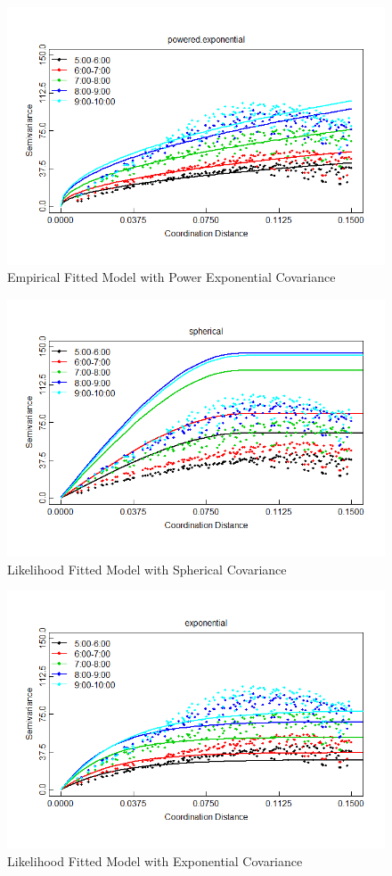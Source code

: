 \documentclass[hidelinks,12pt]{article}
\begin{document}
\FloatBarrier
	\begin{figure}[!ht]
		\includegraphics[width=\textwidth]{semfit_poweredexp.png}
		\caption{Empirical Fitted Model with Power Exponential Covariance \label{fig:sempex}}
	\end{figure}
\FloatBarrier
	\begin{figure}[!ht]
		\includegraphics[width=\textwidth]{lik_spherical.png}
		\caption{Likelihood Fitted Model with Spherical Covariance \label{fig:liksph}}
	\end{figure}
\FloatBarrier
	\begin{figure}[!ht]
		\includegraphics[width=\textwidth]{lik_exponential.png}
		\caption{Likelihood Fitted Model with Exponential Covariance \label{fig:likexp}}
	\end{figure}
\end{document}
